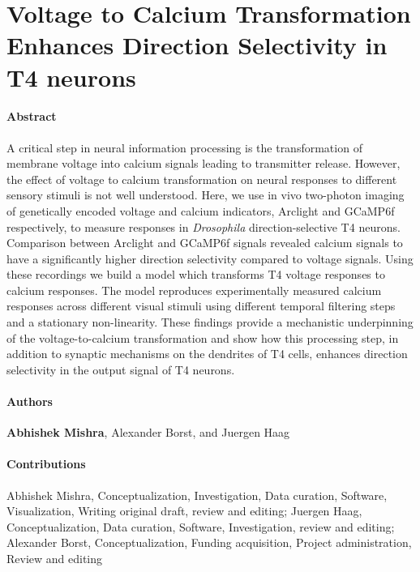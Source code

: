 \section{Voltage to Calcium Transformation Enhances Direction Selectivity in  T4 neurons}
\label{sct:manuscript_mishra_haag}


\paragraph{Abstract}
A critical step in neural information processing is the transformation of membrane voltage into calcium signals leading to transmitter release. However, the effect of voltage to calcium transformation on neural responses to different sensory stimuli is not well understood. Here, we use in vivo two-photon imaging of genetically encoded voltage and calcium indicators, Arclight and GCaMP6f respectively, to measure responses in \textit{Drosophila} direction-selective T4 neurons. Comparison between Arclight and GCaMP6f signals revealed calcium signals to have a significantly higher direction selectivity compared to voltage signals. Using these recordings we build a model which transforms T4 voltage responses to calcium responses. The model reproduces experimentally measured calcium responses across different visual stimuli using different temporal filtering steps and a stationary non-linearity. These findings provide a mechanistic underpinning of the voltage-to-calcium transformation and show how this processing step, in addition to synaptic mechanisms on the dendrites of T4 cells, enhances direction selectivity in the output signal of T4 neurons.


\paragraph{Authors} \textbf{Abhishek Mishra}, Alexander Borst, and Juergen Haag

\paragraph{Contributions}
Abhishek Mishra, Conceptualization, Investigation, Data curation, Software, Visualization, Writing original draft, review and editing; Juergen Haag, Conceptualization, Data curation, Software, Investigation, review and editing; Alexander Borst, Conceptualization, Funding acquisition, Project administration, Review and editing

\cleardoublepage

